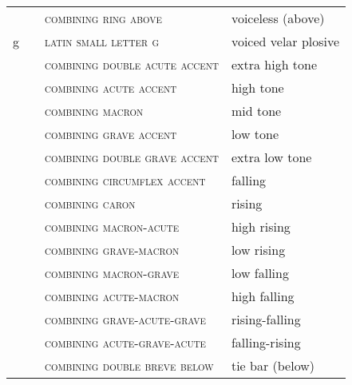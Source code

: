 \label{tab:ipa_lax}
 \tablelasttail{\bottomrule}

\begin{center}
\begin{xtabular}{ l L{1.2cm} L{6.1cm} L{3.5cm} }
 &  & \textsc{combining ring above} & voiceless (above) \\
g &  & \textsc{latin small letter g} & voiced velar plosive \\
 &  & \textsc{combining double acute accent} & extra high tone \\
 &  & \textsc{combining acute accent} & high tone \\
 &  & \textsc{combining macron} & mid tone \\
 &  & \textsc{combining grave accent} & low tone \\
 &  & \textsc{combining double grave accent} & extra low tone \\
 &  & \textsc{combining circumflex accent} & falling \\
 &  & \textsc{combining caron} & rising \\
 &  & \textsc{combining macron-acute} & high rising \\
 &  & \textsc{combining grave-macron} & low rising \\
 &  & \textsc{combining macron-grave} & low falling \\
 &  & \textsc{combining acute-macron} & high falling \\
 &  & \textsc{combining grave-acute-grave} & rising-falling \\
 &  & \textsc{combining acute-grave-acute} & falling-rising \\ 
 &  & \textsc{combining double breve below} & tie bar (below) \\
\end{xtabular}
\end{center}
